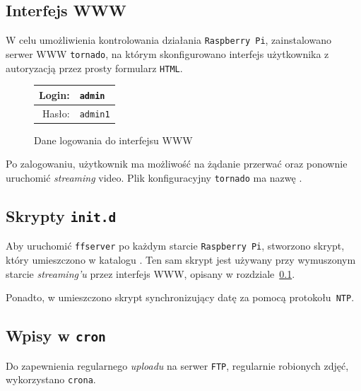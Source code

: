 \documentclass{article}
\begin{document}

\subsection{Interfejs WWW}
\label{sec:www}

W celu umożliwienia kontrolowania działania \texttt{Raspberry~Pi}, zainstalowano serwer WWW \texttt{tornado}, na którym skonfigurowano interfejs użytkownika z autoryzacją przez prosty formularz \texttt{HTML}.
\begin{figure}[H]
\centering
\begin{tabular}{r|l}
Login: & \texttt{admin}\\
\hline
Hasło: & \texttt{admin1}\\
\end{tabular}
\caption{Dane logowania do interfejsu WWW}
\end{figure}
Po zalogowaniu, użytkownik ma możliwość na żądanie przerwać oraz ponownie uruchomić \emph{streaming} video. Plik konfiguracyjny \texttt{tornado} ma nazwę .


\subsection{Skrypty \texttt{init.d}}

Aby uruchomić \texttt{ffserver} po każdym starcie \texttt{Raspberry~Pi}, stworzono skrypt, który umieszczono w katalogu . Ten sam skrypt jest używany przy wymuszonym starcie \emph{streaming'u} przez interfejs WWW, opisany w rozdziale~\ref{sec:www}.

Ponadto, w  umieszczono skrypt synchronizujący datę za pomocą protokołu~\texttt{NTP}.


\subsection{Wpisy w \texttt{cron}}

Do zapewnienia regularnego \emph{uploadu} na serwer \texttt{FTP}, regularnie robionych zdjęć, wykorzystano \texttt{crona}.

\end{document}
